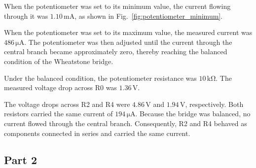 When the potentiometer was set to its minimum value, the current flowing through it was $1.10\,\mathrm{mA}$, as shown in Fig.~\ref{fig:potentiometer_minimum}.

When the potentiometer was set to its maximum value, the measured current was $486\,\mathrm{\mu A}$. The potentiometer was then adjusted until the current through the central branch became approximately zero, thereby reaching the balanced condition of the Wheatstone bridge.

Under the balanced condition, the potentiometer resistance was $10\,\mathrm{k\Omega}$. The measured voltage drop across R0 was $1.36\,\mathrm{V}$.

The voltage drops across R2 and R4 were $4.86\,\mathrm{V}$ and $1.94\,\mathrm{V}$, respectively. Both resistors carried the same current of $194\,\mathrm{\mu A}$. Because the bridge was balanced, no current flowed through the central branch. Consequently, R2 and R4 behaved as components connected in series and carried the same current.

\subsection{Part 2}
